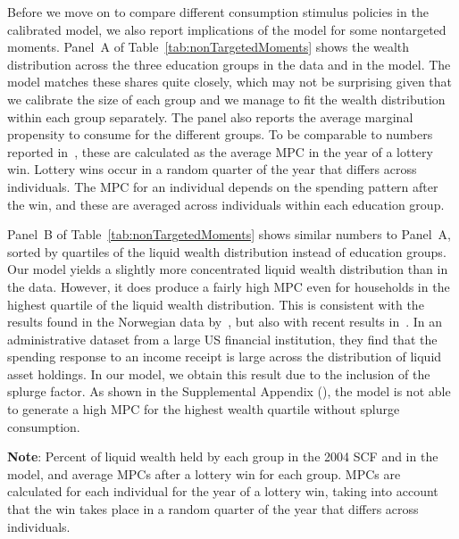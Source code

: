 \documentclass[qe,draft]{econsocart}
\theoremstyle{plain}
\theoremstyle{definition}
\begin{document}
Before we move on to compare different consumption stimulus policies in the calibrated model, we also report implications of the model for some nontargeted moments.
Panel~A of Table~\ref{tab:nonTargetedMoments} shows the wealth distribution across the three education groups in the data and in the model.
The model matches these shares quite closely, which may not be surprising given that we calibrate the size of each group and we manage to fit the wealth distribution within each group separately.
The panel also reports the average marginal propensity to consume for the different groups.
To be comparable to numbers reported in~\cite{fagereng-mpc-2021}, these are calculated as the average MPC in the year of a lottery win.
Lottery wins occur in a random quarter of the year that differs across individuals.
The MPC for an individual depends on the spending pattern after the win, and these are averaged across individuals within each education group.

Panel~B of Table~\ref{tab:nonTargetedMoments} shows similar numbers to Panel~A, sorted by quartiles of the liquid wealth distribution instead of education groups.
Our model yields a slightly more concentrated liquid wealth distribution than in the data.
However, it does produce a fairly high MPC even for households in the highest quartile of the liquid wealth distribution.
This is consistent with the results found in the Norwegian data by~\cite{fagereng-mpc-2021}, but also with recent results in~\cite{graham2026mental}.
In an administrative dataset from a large US financial institution, they find that the spending response to an income receipt is large across the distribution of liquid asset holdings.
In our model, we obtain this result due to the inclusion of the splurge factor.
As shown in the Supplemental Appendix (\cite{carroll2026welfareSupplement}), the model is not able to generate a high MPC for the highest wealth quartile without splurge consumption.

\begin{table}[tb] 
  \caption{\pregenmark Model fit with respect to nontargeted moments}
  \label{tab:nonTargetedMoments} %
  \centering


  \vspace{0.5em}

  \noindent\parbox{\textwidth}{\footnotesize
    \textbf{Note}: Percent of liquid wealth held by each group in the 2004 SCF and in the model, and average MPCs after a lottery win for each group. MPCs are calculated for each individual for the year of a lottery win, taking into account that the win takes place in a random quarter of the year that differs across individuals.}

  \vspace{0.5em}

\end{table}
\end{document}
